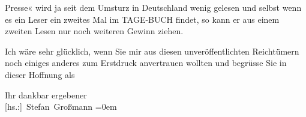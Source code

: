                   Presse« wird ja seit dem Umsturz in Deutschland wenig gelesen und selbst wenn es ein Leser ein zweites Mal im
                  TAGE-BUCH findet, so kann {\pb}er aus einem zweiten Lesen nur
               noch weiteren Gewinn ziehen.\pend
           
\pstart
           Ich wäre sehr glücklich, wenn Sie mir aus diesen unveröffentlichten Reichtümern noch
               einiges anderes zum Erstdruck anvertrauen wollten und begrüsse Sie in dieser Hoffnung
               als\pend
           
\pstart
           Ihr dankbar ergebener{\\[\baselineskip]}\spacefill\mbox{{[}hs.:{]} Stefan Großmann}\pend
           \leftskip=0em{}\endnumbering{}  \newcommand{\dateiname}{L02475}\newcommand{\titel}{Stefan Großmann an Arthur Schnitzler, 25. 5. 1926}\newcommand{\editorInnen}{Herausgegeben von Martin Anton Müller}
